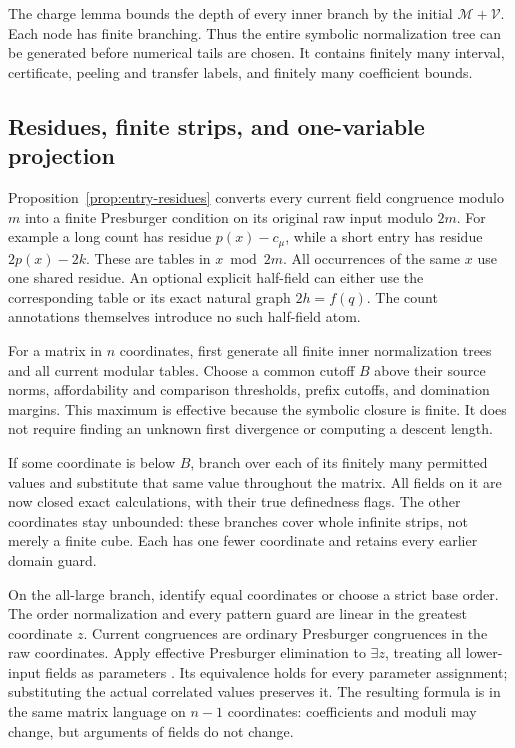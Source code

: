 The charge lemma bounds the depth of every inner branch by the initial
\(\mathcal M+\mathcal V\). Each node has finite branching. Thus the
entire symbolic normalization tree can be generated before numerical
tails are chosen. It contains finitely many interval, certificate,
peeling and transfer labels, and finitely many coefficient bounds.

\subsection{Residues, finite strips, and one-variable projection}

Proposition~\ref{prop:entry-residues} converts every current field
congruence modulo \(m\) into a finite Presburger condition on its
original raw input modulo \(2m\). For example a long count has residue
\(p(x)-c_\mu\), while a short entry has residue \(2p(x)-2k\).
These are tables in \(x\bmod2m\). All occurrences of the same \(x\)
use one shared residue. An optional explicit half-field can either use
the corresponding table or its exact natural graph \(2h=f(q)\).
The count annotations themselves introduce no such half-field atom.

For a matrix in \(n\) coordinates, first generate all finite inner
normalization trees and all current modular tables. Choose a common
cutoff \(B\) above their source norms, affordability and comparison
thresholds, prefix cutoffs, and domination margins. This maximum is
effective because the symbolic closure is finite. It does not require
finding an unknown first divergence or computing a descent length.

If some coordinate is below \(B\), branch over each of its finitely
many permitted values and substitute that same value throughout the
matrix. All fields on it are now closed exact calculations, with their
true definedness flags. The other coordinates stay unbounded: these
branches cover whole infinite strips, not merely a finite cube. Each
has one fewer coordinate and retains every earlier domain guard.

On the all-large branch, identify equal coordinates or choose a strict
base order. The order normalization and every pattern guard are linear
in the greatest coordinate \(z\). Current congruences are ordinary
Presburger congruences in the raw coordinates. Apply effective Presburger
elimination to \(\exists z\), treating all lower-input fields as
parameters \cite{cooper}. Its equivalence holds for every parameter
assignment; substituting the actual correlated values preserves it.
The resulting formula is in the same matrix language on \(n-1\)
coordinates: coefficients and moduli may change, but arguments of fields
do not change.

